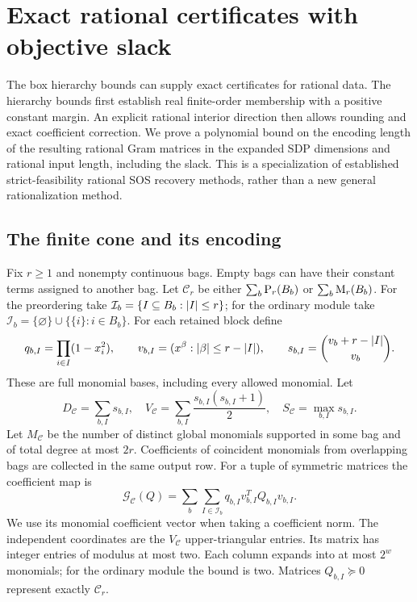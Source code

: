 \section{Exact rational certificates with objective slack}\label{sec:certificates}

The box hierarchy bounds can supply exact certificates for rational data.
The hierarchy bounds first establish real finite-order membership with a
positive constant margin. An explicit rational interior direction then
allows rounding and exact coefficient correction. We prove a polynomial bound on the encoding
length of the resulting rational Gram matrices in the expanded SDP
dimensions and rational input length, including the slack. This is a
specialization of established strict-feasibility rational
SOS recovery methods, rather than a new general rationalization method.

\subsection{The finite cone and its encoding}\label{sec:rat-encoding}

Fix $r\ge1$ and nonempty continuous bags. Empty bags can have their
constant terms assigned to another bag. Let $\mathcal C_r$ be either
$\sum_b\mathrm{P}_r(B_b)$ or $\sum_b\mathrm{M}_r(B_b)$. For the preordering take
$\mathcal I_b=\{I\subseteq B_b:\lvert I\rvert\le r\}$; for the ordinary module take
$\mathcal I_b=\{\varnothing\}\cup\{\{i\}:i\in B_b\}$.
For each retained block define
\[
 q_{b,I}=\prod_{i\in I}(1-x_i^2),\qquad
 v_{b,I}=(x^\beta:\lvert \beta\rvert\le r-\lvert I\rvert),\qquad
 s_{b,I}=\binom{v_b+r-\lvert I\rvert}{v_b}.
\]
These are full monomial bases, including every allowed monomial. Let
\[
 D_{\mathcal C}=\sum_{b,I}s_{b,I},\quad
 V_{\mathcal C}=\sum_{b,I}\frac{s_{b,I}(s_{b,I}+1)}2,\quad
 S_{\mathcal C}=\max_{b,I}s_{b,I}.
\]
Let $M_{\mathcal C}$ be the number of distinct global monomials supported
in some bag and of total degree at most $2r$. Coefficients of coincident
monomials from overlapping bags are collected in the same output row.
For a tuple of symmetric matrices the coefficient map is
\begin{equation}\label{eq:rat-map}
 \mathcal G_{\mathcal C}(Q)=
 \sum_b\sum_{I\in\mathcal I_b}q_{b,I}v_{b,I}^{T}Q_{b,I}v_{b,I}.
\end{equation}
We use its monomial coefficient vector when taking a coefficient norm.
The independent coordinates are the $V_{\mathcal C}$ upper-triangular
entries. Its matrix has integer entries of modulus at most two. Each
column expands into at most $2^w$ monomials; for the ordinary module the
bound is two. Matrices $Q_{b,I}\succeq0$ represent exactly $\mathcal C_r$.

